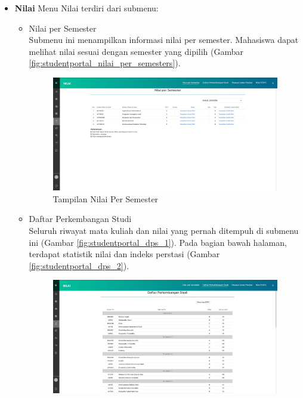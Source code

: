 \begin{enumerate}
\begin{itemize}
\begin{itemize}
\begin{figure}[H]
			\end{figure}
		\end{itemize}
		\item \textbf{Nilai}
		Menu Nilai terdiri dari submenu:
		\begin{itemize}
			\item Nilai per Semester \\
			Submenu ini menampilkan informasi nilai per semester. Mahasiswa dapat melihat nilai sesuai dengan semester yang dipilih (Gambar \ref{fig:studentportal_nilai_per_semesters}).
			\begin{figure}[H]
				\centering
				\includegraphics[scale=0.3]{Gambar/studentportal_nilai_per_semester}
				\caption{Tampilan Nilai Per Semester}
				\label{fig:studentportal_nilai_per_semester}
			\end{figure}
			\item Daftar Perkembangan Studi \\
			Seluruh riwayat mata kuliah dan nilai yang pernah ditempuh di submenu ini (Gambar \ref{fig:studentportal_dps_1}). Pada bagian bawah halaman, terdapat statistik nilai dan indeks perstasi (Gambar \ref{fig:studentportal_dps_2}).
			\begin{figure}[H]
				\centering
				\includegraphics[scale=0.3]{Gambar/studentportal_dps_1}

\end{figure}
\end{itemize}
\end{itemize}
\end{enumerate}
